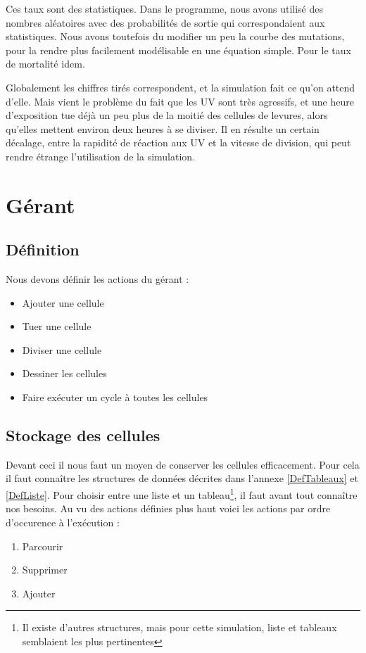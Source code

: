   Ces taux sont des statistiques. Dans le programme, nous avons utilisé des nombres aléatoires avec des probabilités de sortie qui correspondaient aux statistiques. Nous avons toutefois du modifier un peu la courbe des mutations, pour la rendre plus facilement modélisable en une équation simple. Pour le taux de mortalité idem.
  
  Globalement les chiffres tirés correspondent, et la simulation fait ce qu'on attend d'elle. Mais vient le problème du fait que les UV sont très agressifs, et une heure d'exposition tue déjà un peu plus de la moitié des cellules de levures, alors qu'elles mettent environ deux heures à se diviser. Il en résulte un certain décalage, entre la rapidité de réaction aux UV et la vitesse de division, qui peut rendre étrange l'utilisation de la simulation.

\section{Gérant}
\subsection{Définition}
Nous devons définir les actions du gérant : 
\begin{itemize}
	\item Ajouter une cellule
	\item Tuer une cellule
	\item Diviser une cellule
	\item Dessiner les cellules
	\item Faire exécuter un cycle à toutes les cellules
\end{itemize}

\subsection{Stockage des cellules}
Devant ceci il nous faut un moyen de conserver les cellules efficacement.
Pour cela il faut connaître les structures de données décrites dans l'annexe \ref{DefTableaux} et \ref{DefListe}. Pour choisir entre une liste et un tableau\footnote{Il existe d'autres structures, mais pour cette simulation, liste et tableaux semblaient les plus pertinentes}, il faut avant tout connaître nos besoins. Au vu des actions définies plus haut voici les actions par ordre d'occurence à l'exécution : 
\begin{enumerate}
	\item Parcourir 
	\item Supprimer
	\item Ajouter
\end{enumerate}

